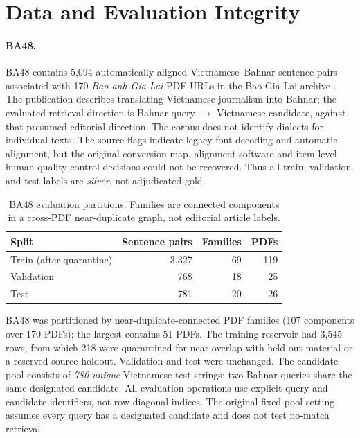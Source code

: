 \section{Data and Evaluation Integrity}\label{sec:data}
\paragraph{BA48.} BA48 contains 5,094 automatically aligned Vietnamese--Bahnar sentence pairs associated with 170 \emph{Bao anh Gia Lai} PDF URLs in the Bao Gia Lai archive \cite{baogialai2023thousand,baogialai2012translation}. The publication describes translating Vietnamese journalism into Bahnar; the evaluated retrieval direction is Bahnar query $\rightarrow$ Vietnamese candidate, against that presumed editorial direction. The corpus does not identify dialects for individual texts. The source flags indicate legacy-font decoding and automatic alignment, but the original conversion map, alignment software and item-level human quality-control decisions could not be recovered. Thus all train, validation and test labels are \emph{silver}, not adjudicated gold.

\begin{table}[t]
\centering\small
\caption{BA48 evaluation partitions. Families are connected components in a cross-PDF near-duplicate graph, not editorial article labels.}
\label{tab:splits}

\begin{tabular}{lrrr}
\toprule
Split & Sentence pairs & Families & PDFs \\
\midrule
Train (after quarantine) & 3,327 & 69 & 119 \\
Validation & 768 & 18 & 25 \\
Test & 781 & 20 & 26 \\
\bottomrule
\end{tabular}
\end{table}

BA48 was partitioned by near-duplicate-connected PDF families (107 components over 170 PDFs); the largest contains 51 PDFs. The training reservoir had 3,545 rows, from which 218 were quarantined for near-overlap with held-out material or a reserved source holdout. Validation and test were unchanged. The candidate pool consists of \emph{780 unique} Vietnamese test strings: two Bahnar queries share the same designated candidate. All evaluation operations use explicit query and candidate identifiers, not row-diagonal indices. The original fixed-pool setting assumes every query has a designated candidate and does not test no-match retrieval.

